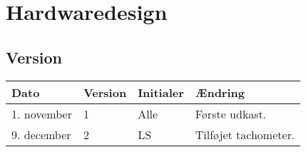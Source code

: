 \chapter{Hardwaredesign}
\section*{Version}
\begin{table}[h]
	\centering
	\begin{tabularx}{\textwidth - 2cm}{|l|l|l|X|}
	\hline
	Dato			& Version			& Initialer 		& Ændring										\\ \hline
	1. november 			& 1 				& Alle				& Første udkast. 						\\ \hline
	9. december 			& 2 				& LS				& Tilføjet tachometer.					\\ \hline
	\end{tabularx}
\end{table}
\clearpage



